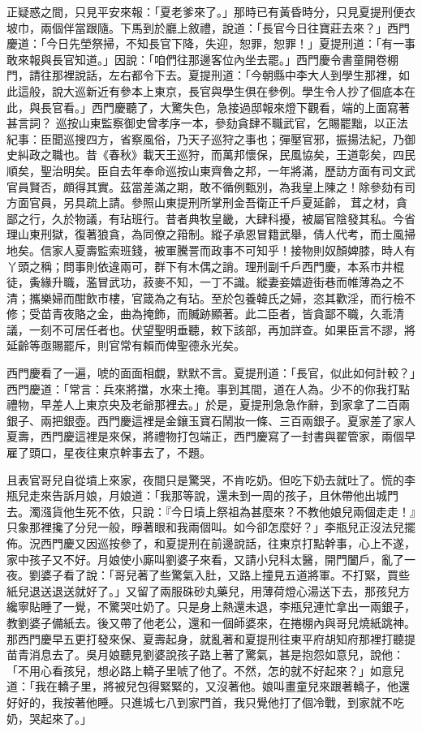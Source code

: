 正疑惑之間，只見平安來報：「夏老爹來了。」那時已有黃昏時分，只見夏提刑便衣坡巾，兩個伴當跟隨。下馬到於廳上敘禮，說道：「長官今日往寶莊去來？」西門慶道：「今日先塋祭掃，不知長官下降，失迎，恕罪，恕罪！」夏提刑道：「有一事敢來報與長官知道。」因說：「咱們往那邊客位內坐去罷。」西門慶令書童開卷棚門，請往那裡說話，左右都令下去。夏提刑道：「今朝縣中李大人到學生那裡，如此這般，說大巡新近有參本上東京，長官與學生俱在參例。學生令人抄了個底本在此，與長官看。」西門慶聽了，大驚失色，急接過邸報來燈下觀看，端的上面寫著甚言詞？
巡按山東監察御史曾孝序一本，參劾貪肆不職武官，乞賜罷黜，以正法紀事：臣聞巡搜四方，省察風俗，乃天子巡狩之事也；彈壓官邪，振揚法紀，乃御史糾政之職也。昔《春秋》載天王巡狩，而萬邦懷保，民風協矣，王道彰矣，四民順矣，聖治明矣。臣自去年奉命巡按山東齊魯之邦，一年將滿，歷訪方面有司文武官員賢否，頗得其實。茲當差滿之期，敢不循例甄別，為我皇上陳之！除參劾有司方面官員，另具疏上請。參照山東提刑所掌刑金吾衛正千戶夏延齡，𦶑茸之材，貪鄙之行，久於物議，有玷班行。昔者典牧皇畿，大肆科擾，被屬官陰發其私。今省理山東刑獄，復著狼貪，為同僚之箝制。縱子承恩冒籍武舉，倩人代考，而士風掃地矣。信家人夏壽監索班錢，被軍騰詈而政事不可知乎！接物則奴顏婢膝，時人有丫頭之稱；問事則依違兩可，群下有木偶之誚。理刑副千戶西門慶，本系市井棍徒，夤緣升職，濫冒武功，菽麥不知，一丁不識。縱妻妾嬉遊街巷而帷薄為之不清；攜樂婦而酣飲市樓，官箴為之有玷。至於包養韓氏之婦，恣其歡淫，而行檢不修；受苗青夜賂之金，曲為掩飾，而贓跡顯著。此二臣者，皆貪鄙不職，久乖清議，一刻不可居任者也。伏望聖明垂聽，敕下該部，再加詳查。如果臣言不謬，將延齡等亟賜罷斥，則官常有賴而俾聖德永光矣。

西門慶看了一遍，唬的面面相覷，默默不言。夏提刑道：「長官，似此如何計較？」西門慶道：「常言：兵來將擋，水來土掩。事到其間，道在人為。少不的你我打點禮物，早差人上東京央及老爺那裡去。」於是，夏提刑急急作辭，到家拿了二百兩銀子、兩把銀壺。西門慶這裡是金鑲玉寶石鬧妝一條、三百兩銀子。夏家差了家人夏壽，西門慶這裡是來保，將禮物打包端正，西門慶寫了一封書與翟管家，兩個早雇了頭口，星夜往東京幹事去了，不題。

且表官哥兒自從墳上來家，夜間只是驚哭，不肯吃奶。但吃下奶去就吐了。慌的李瓶兒走來告訴月娘，月娘道：「我那等說，還未到一周的孩子，且休帶他出城門去。濁漒貨他生死不依，只說：『今日墳上祭祖為甚麼來？不教他娘兒兩個走走！』只象那裡攙了分兒一般，睜著眼和我兩個叫。如今卻怎麼好？」李瓶兒正沒法兒擺佈。況西門慶又因巡按參了，和夏提刑在前邊說話，往東京打點幹事，心上不遂，家中孩子又不好。月娘使小廝叫劉婆子來看，又請小兒科太醫，開門闔戶，亂了一夜。劉婆子看了說：「哥兒著了些驚氣入肚，又路上撞見五道將軍。不打緊，買些紙兒退送退送就好了。」又留了兩服硃砂丸藥兒，用薄荷燈心湯送下去，那孩兒方纔寧貼睡了一覺，不驚哭吐奶了。只是身上熱還未退，李瓶兒連忙拿出一兩銀子，教劉婆子備紙去。後又帶了他老公，還和一個師婆來，在捲棚內與哥兒燒紙跳神。那西門慶早五更打發來保、夏壽起身，就亂著和夏提刑往東平府胡知府那裡打聽提苗青消息去了。吳月娘聽見劉婆說孩子路上著了驚氣，甚是抱怨如意兒，說他：「不用心看孩兒，想必路上轎子里唬了他了。不然，怎的就不好起來？」如意兒道：「我在轎子里，將被兒包得緊緊的，又沒著他。娘叫畫童兒來跟著轎子，他還好好的，我按著他睡。只進城七八到家門首，我只覺他打了個冷戰，到家就不吃奶，哭起來了。」

